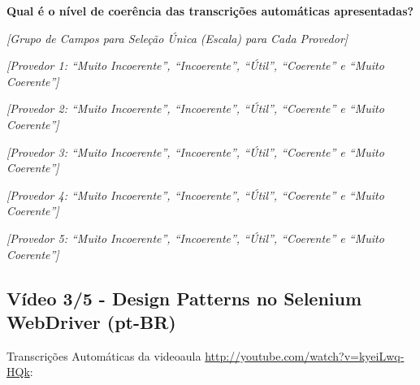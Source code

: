 \noindent
\textbf{Qual é o nível de coerência das transcrições automáticas apresentadas?}

\noindent
\textit{[Grupo de Campos para Seleção Única (Escala) para Cada Provedor]}

\noindent
\textit{[Provedor 1: ``Muito Incoerente'', ``Incoerente'', ``Útil'', ``Coerente'' e ``Muito Coerente'']}

\noindent
\textit{[Provedor 2: ``Muito Incoerente'', ``Incoerente'', ``Útil'', ``Coerente'' e ``Muito Coerente'']}

\noindent
\textit{[Provedor 3: ``Muito Incoerente'', ``Incoerente'', ``Útil'', ``Coerente'' e ``Muito Coerente'']}

\noindent
\textit{[Provedor 4: ``Muito Incoerente'', ``Incoerente'', ``Útil'', ``Coerente'' e ``Muito Coerente'']}

\noindent
\textit{[Provedor 5: ``Muito Incoerente'', ``Incoerente'', ``Útil'', ``Coerente'' e ``Muito Coerente'']}

\subsection{Vídeo 3/5 - Design Patterns no Selenium WebDriver (pt-BR)}

\noindent
Transcrições Automáticas da videoaula \url{http://youtube.com/watch?v=kyeiLwq-HQk}:


